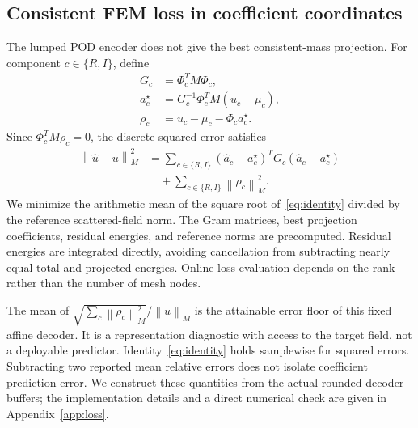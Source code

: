 \documentclass{article}
\newcommand{\norm}[1]{\left\lVert#1\right\rVert}
\begin{document}
\subsection{Consistent FEM loss in coefficient coordinates}
The lumped POD encoder does not give the best consistent-mass projection. For component $c\in\{R,I\}$, define
\begin{align}
G_c&=\Phi_c^TM\Phi_c,\nonumber\\
a_c^\star&=G_c^{-1}\Phi_c^TM(u_c-\mu_c),\label{eq:best}\\
\rho_c&=u_c-\mu_c-\Phi_ca_c^\star.\nonumber
\end{align}
Since $\Phi_c^TM\rho_c=0$, the discrete squared error satisfies
\begin{align}
\norm{\widehat u-u}_M^2
&=\sum_{c\in\{R,I\}}
(\widehat a_c-a_c^\star)^TG_c(\widehat a_c-a_c^\star)\nonumber\\
&\hspace{1em}+\sum_{c\in\{R,I\}}\norm{\rho_c}_M^2.\label{eq:identity}
\end{align}
We minimize the arithmetic mean of the square root of~\eqref{eq:identity} divided by the reference scattered-field norm. The Gram matrices, best projection coefficients, residual energies, and reference norms are precomputed. Residual energies are integrated directly, avoiding cancellation from subtracting nearly equal total and projected energies. Online loss evaluation depends on the rank rather than the number of mesh nodes.

The mean of $\sqrt{\sum_c\norm{\rho_c}_M^2}/\norm{u}_M$ is the attainable error floor of this fixed affine decoder. It is a representation diagnostic with access to the target field, not a deployable predictor. Identity~\eqref{eq:identity} holds samplewise for squared errors. Subtracting two reported mean relative errors does not isolate coefficient prediction error. We construct these quantities from the actual rounded decoder buffers; the implementation details and a direct numerical check are given in Appendix~\ref{app:loss}.
\end{document}
